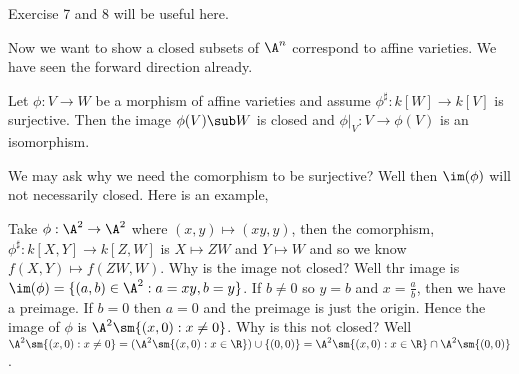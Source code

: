 \begin{eg}
  Exercise 7 and 8 will be useful here.
\end{eg}

\noindent
Now we want to show a closed subsets of $\A^n$ correspond to affine varieties. We have seen the forward direction already.
\begin{nlemma}
  Let $\phi : V \to W$ be a morphism of affine varieties and assume $\phi^\sharp : k[W] \to k[V]$ is surjective. Then the image $\phi(V) \sub W$ is closed and $\phi|_V : V \to \phi(V)$ is an isomorphism.
\end{nlemma}
\begin{remark}
   We may ask why we need the comorphism to be surjective? Well then $\im(\phi)$ will not necessarily closed. Here is an example,
   \begin{eg}
     Take $\phi : \A^2 \to \A^2$ where $(x, y) \mapsto (xy, y)$, then the comorphism, $\phi^\sharp : k[X, Y] \to k[Z, W]$ is $X \mapsto ZW$ and $Y \mapsto W$ and so we know $f(X, Y) \mapsto f(ZW, W)$. Why is the image not closed? Well thr image is $\im(\phi) = \{(a, b) \in \A^2 : a = xy, b = y\}$. If $b \ne 0$ so $y = b$
     and $x = \frac{a}{b}$, then we have a preimage. If $b = 0$ then $a= 0$ and the preimage is just the origin. Hence the image of $\phi$ is $\A^2 \sm \{(x, 0) : x \ne 0\}$. Why is this not closed? Well $\A^2 \sm \{(x, 0) : x \ne 0\} = (\A^2 \sm \{(x, 0) : x \in \R\}) \cup \{(0, 0)\} = \A^2 \sm \{(x, 0) : x \in \R\} \cap \A^2 \sm \{(0, 0)\}$.
   \end{eg}
\end{remark}

